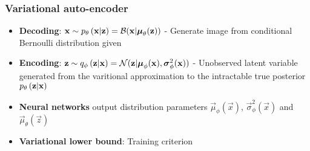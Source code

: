 \subsubsection{Variational auto-encoder} %
\label{ssub:variational_auto_encoder}
\begin{itemize}
	\item \textbf{Decoding}: $\bm{\mathrm{x}} \sim p_{\theta}\left(\bm{\mathrm{x}}|\bm{\mathrm{z}}\right)=\mathcal{B}( \bm{\mathrm{x}}|\bm{\mathrm{\mu}}_\theta(\bm{\mathrm{z}}))$ - Generate image from conditional Bernoulli distribution given
	\item \textbf{Encoding}: $\bm{\mathrm{z}} \sim q_{\phi}\left(\bm{\mathrm{z}}|\bm{\mathrm{x}}\right)=\mathcal{N}( \bm{\mathrm{z}}|\bm{\mathrm{\mu}}_\phi(\bm{\mathrm{x}}),\bm{\mathrm{\sigma}}^2_\phi(\bm{\mathrm{x}}))$ - Unobserved latent variable generated from the varitional approximation to the intractable true posterior $p_{\theta}\left(\bm{\mathrm{z}}|\bm{\mathrm{x}}\right)$
	\item \textbf{Neural networks} output distribution parameters $\vec{\mu}_\phi(\vec{x})$, $\vec{\sigma}^2_\phi(\vec{x})$ and $\vec{\mu}_\theta(\vec{z})$
	\item \textbf{Variational lower bound}: Training criterion 

\end{itemize}
